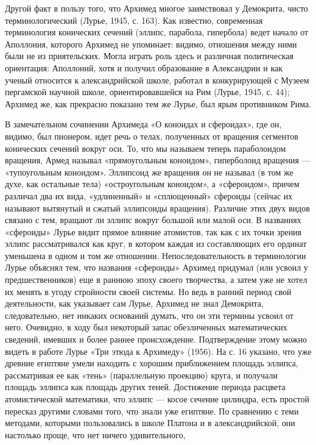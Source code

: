Другой факт в пользу того, что Архимед многое заимствовал у
Демокрита, чисто терминологический (Лурье, 1945, с. 163). Как
известно, современная терминология конических сечений (эллипс,
парабола, гипербола) ведет начало от Аполлония, которого Архимед не
упоминает: видимо, отношения между ними были не из приятельских. Могла
играть роль здесь и различная политическая ориентация: Аполлоний, хотя
и получил образование в Александрии и как ученый относится к
александрийской школе, работал в конкурирующей с Музеем пергамской
научной школе, ориентировавшейся на Рим (Лурье, 1945, с. 44); Архимед
же, как прекрасно показано тем же Лурье, был ярым противником Рима.

В замечательном сочинении Архимеда «О коноидах и сфероидах», где он,
видимо, был пионером, идет речь о телах, полученных от вращения
сегментов конических сечений вокруг оси. То, что мы называем теперь
параболоидом вращения, Армед называл «прямоугольным коноидом»,
гиперболоид вращения --- «тупоугольным коноидом». Эллипсоид же
вращения он не называл (в том же духе, как остальные тела)
«остроугольным коноидом», а «сфероидом», причем различал два их вида,
«удлиненный» и «сплющенный» сфероиды (сейчас их называют вытянутый и
сжатый эллипсоиды вращения). Различие этих двух видов связано с тем,
вращают ли эллипс вокруг большой или малой оси. В названиях «сфероиды»
Лурье видит прямое влияние атомистов, так как с их точки зрения эллипс
рассматривался как круг, в котором каждая из составляющих его ординат
уменьшена в одном и том же отношении. Непоследовательность в
терминологии Лурье объяснял тем, что названия «сфероиды» Архимед
придумал (или усвоил у предшественников) еще в раннюю эпоху своего
творчества, а затем уже не хотел их менять в угоду стройности своей
системы. Но ведь в ранний период свой деятельности, как указывает сам
Лурье, Архимед не знал Демокрита, следовательно, нет никаких оснований
думать, что он эти термины усвоил от него. Очевидно, в ходу был
некоторый запас обезличенных математических сведений, имевших и более
раннее происхождение. Подтверждение этому можно видеть в работе Лурье
«Три этюда к Архимеду» (1956). На с. 16 указано, что уже древние
египтяне умели находить с хорошим приближением площадь эллипса,
рассматривая ее как «тень» (параллельную проекцию) круга, и получали
площадь эллипса как площадь других теней. Достижение периода расцвета
атомистической математики, что эллипс --- косое сечение цилиндра, есть
простой пересказ другими словами того, что знали уже египтяне. По
сравнению с теми методами, которыми пользовались в школе Платона и в
александрийской, они настолько проще, что нет ничего удивительного,
